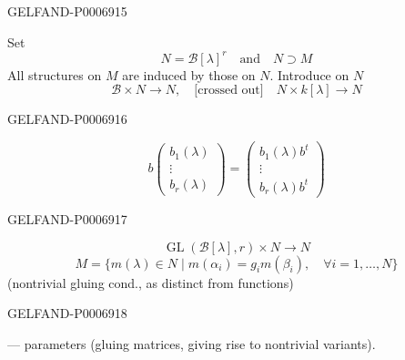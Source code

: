 \begin{GelfandAdjacentEvidence}{GELFAND-P000691}{5}


Set
\[
N=\mathcal B[\lambda]^r\quad\text{and}\quad N\supset M
\]
All structures on \(M\) are induced by those on \(N\). Introduce on \(N\)
\[
\mathcal B\times N\to N,\quad\text{[crossed out]}\quad N\times k[\lambda]\to N
\]
\end{GelfandAdjacentEvidence}
\begin{GelfandAdjacentEvidence}{GELFAND-P000691}{6}

\[
b\begin{pmatrix}b_1(\lambda)\\\vdots\\b_r(\lambda)\end{pmatrix}
=\begin{pmatrix}b_1(\lambda)b^t\\\vdots\\b_r(\lambda)b^t\end{pmatrix}
\]
\end{GelfandAdjacentEvidence}
\begin{GelfandAdjacentEvidence}{GELFAND-P000691}{7}

\[
\operatorname{GL}(\mathcal B[\lambda],r)\times N\to N
\]
\[
M=\{m(\lambda)\in N\mid m(\alpha_i)=g_i m(\beta_i),
\quad\forall i=1,\ldots,N\}
\]
(nontrivial gluing cond., as distinct from functions)

\end{GelfandAdjacentEvidence}
\begin{GelfandAdjacentEvidence}{GELFAND-P000691}{8}

--- parameters (gluing matrices, giving rise to nontrivial variants).

\end{GelfandAdjacentEvidence}
